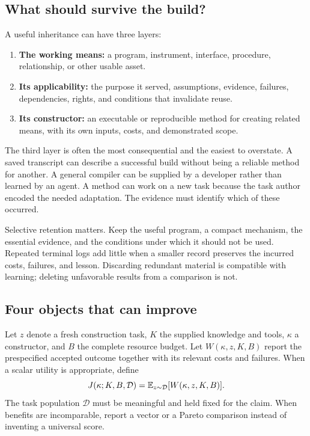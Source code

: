 \subsection{What should survive the build?}

A useful inheritance can have three layers:
\begin{enumerate}
\item \textbf{The working means:} a program, instrument, interface, procedure, relationship, or other usable asset.
\item \textbf{Its applicability:} the purpose it served, assumptions, evidence, failures, dependencies, rights, and conditions that invalidate reuse.
\item \textbf{Its constructor:} an executable or reproducible method for creating related means, with its own inputs, costs, and demonstrated scope.
\end{enumerate}

The third layer is often the most consequential and the easiest to overstate. A saved transcript can describe a successful build without being a reliable method for another. A general compiler can be supplied by a developer rather than learned by an agent. A method can work on a new task because the task author encoded the needed adaptation. The evidence must identify which of these occurred.

Selective retention matters. Keep the useful program, a compact mechanism, the essential evidence, and the conditions under which it should not be used. Repeated terminal logs add little when a smaller record preserves the incurred costs, failures, and lesson. Discarding redundant material is compatible with learning; deleting unfavorable results from a comparison is not.

\subsection{Four objects that can improve}

Let $z$ denote a fresh construction task, $K$ the supplied knowledge and tools, $\kappa$ a constructor, and $B$ the complete resource budget. Let $W(\kappa,z,K,B)$ report the prespecified accepted outcome together with its relevant costs and failures. When a scalar utility is appropriate, define
\begin{equation}
J(\kappa;K,B,\mathcal D)=\mathbb{E}_{z\sim\mathcal D}[W(\kappa,z,K,B)].
\label{eq:constructor}
\end{equation}
The task population $\mathcal D$ must be meaningful and held fixed for the claim. When benefits are incomparable, report a vector or a Pareto comparison instead of inventing a universal score.

